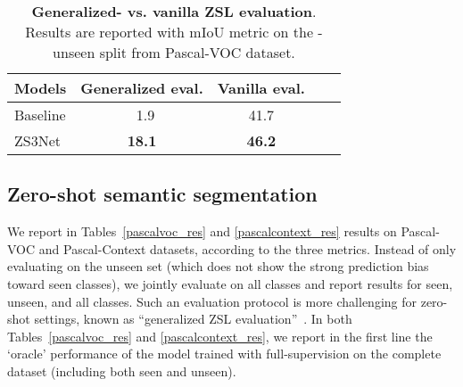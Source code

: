 \documentclass{article}
\begin{document}
\begin{SCtable}
\centering
\caption{\textbf{Generalized- vs. vanilla ZSL evaluation}. Results are reported with mIoU metric on the -unseen split from Pascal-VOC dataset.}
\small{
\begin{tabular}{lccll}\toprule
Models &  Generalized eval. & Vanilla eval.  \\ \midrule[1.1pt]
Baseline   &        ~1.9     &    41.7       \\ \midrule
ZS3Net       &        \bf 18.1   & \bf 46.2  \\ \bottomrule
\end{tabular}
}
\vspace{-0.5cm}
\label{vanillia_zsc}
\end{SCtable}

\subsection{Zero-shot semantic segmentation}\label{sec:exp_results}
We report in Tables~\ref{pascalvoc_res} and \ref{pascalcontext_res} results on Pascal-VOC and Pascal-Context datasets, according to the three metrics.
Instead of only evaluating on the unseen set (which does not show the strong prediction bias toward seen classes), we jointly evaluate on all classes and report results for seen, unseen, and all classes.
Such an evaluation protocol is more challenging for zero-shot settings, known as ``generalized ZSL evaluation''~\cite{chao2016empirical}.
In both Tables~\ref{pascalvoc_res} and \ref{pascalcontext_res}, we report in the first line the `oracle' performance of the model trained with full-supervision on the complete dataset (including both seen and unseen).
\end{document}
